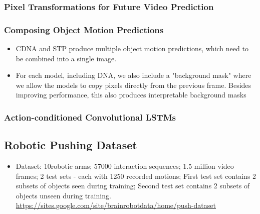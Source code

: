 \documentclass{article}
\begin{document}
    \subsubsection{Pixel Transformations for Future Video Prediction}\label{subsubsec:Unsupervised_Learning_for_Physical_Interaction_through_Video_Prediction:pixel-transformations-for-future-video-prediction}

    \subsubsection{Composing Object Motion Predictions}\label{subsubsec:Unsupervised_Learning_for_Physical_Interaction_through_Video_Prediction:composing-object-motion-predictions}
    \begin{itemize}
        \item CDNA and STP produce multiple object motion predictions, which need to be combined into a single image.
        \item For each model, including DNA, we also include a "background mask" where we allow the models to copy pixels directly from the previous frame.
        Besides improving performance, this also produces interpretable background masks
    \end{itemize}

    \subsubsection{Action-conditioned Convolutional LSTMs}\label{subsubsec:Unsupervised_Learning_for_Physical_Interaction_through_Video_Prediction:action-conditioned-convolutional-lstms}

    \subsection{Robotic Pushing Dataset}\label{subsec:Unsupervised_Learning_for_Physical_Interaction_through_Video_Prediction:robotic-pushing-dataset}
    \begin{itemize}
        \itemsep0em
        \item Dataset: 10robotic arms;
        57000 interaction sequences;
        1.5 million video frames;
        2 test sets - each with 1250 recorded motions;
        First test set contains 2 subsets of objects seen during training;
        Second test set contains 2 subsets of objects unseen during training. \\
        \url{https://sites.google.com/site/brainrobotdata/home/push-dataset}
    \end{itemize}
\end{document}
